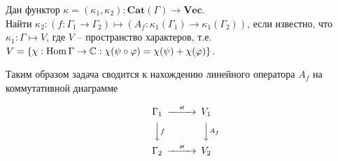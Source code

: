 \begin{problem}
    Дан функтор $\kappa = (\kappa_1, \kappa_2): \mathbf{Cat}(\Gamma) \to 
    \mathbf{Vec}$. \\ 
    Найти $\kappa_2 : (f: \Gamma_1 \to \Gamma_2) \mapsto 
    (A_f: \kappa_1(\Gamma_1) \to \kappa_1(\Gamma_2))$, если известно, что 
    $\kappa_1 : \Gamma \mapsto V$, где $V$ -- пространство характеров, т.е. 
    $V = \{\chi: \operatorname*{Hom} \Gamma \to \mathbb{C}: \chi(\psi \circ \varphi) = 
    \chi(\psi) + \chi(\varphi)\}$.
\end{problem}

Таким образом задача сводится к нахождению линейного оператора $A_f$ на 
коммутативной диаграмме

\begin{equation}\label{cd}
    \begin{CD}
        \Gamma_1 @>\kappa>> V_1 \\
        @VVfV          @VVA_fV\\
        \Gamma_2 @>\kappa>> V_2
    \end{CD}
\end{equation}

